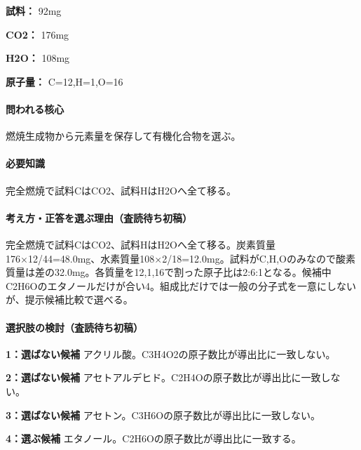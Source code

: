 \noindent\textbf{試料：} 92mg\par

\noindent\textbf{CO2：} 176mg\par

\noindent\textbf{H2O：} 108mg\par

\noindent\textbf{原子量：} C=\allowbreak{}12,H=\allowbreak{}1,O=\allowbreak{}16\par

\paragraph{問われる核心} 燃焼生成物から元素量を保存して有機化合物を選ぶ。

\paragraph{必要知識} 完全燃焼で試料CはCO2、試料HはH2Oへ全て移る。

\paragraph{考え方・正答を選ぶ理由（査読待ち初稿）} 完全燃焼で試料CはCO2、試料HはH2Oへ全て移る。炭素質量176×12/44=\allowbreak{}48.0mg、水素質量108×2/18=\allowbreak{}12.0mg。試料がC,H,Oのみなので酸素質量は差の32.0mg。各質量を12,1,16で割った原子比は2:6:1となる。候補中C2H6Oのエタノールだけが合い4。組成比だけでは一般の分子式を一意にしないが、提示候補比較で選べる。

\paragraph{選択肢の検討（査読待ち初稿）}\mbox{}\par

\noindent\textbf{1：選ばない候補} アクリル酸。C3H4O2の原子数比が導出比に一致しない。\par

\noindent\textbf{2：選ばない候補} アセトアルデヒド。C2H4Oの原子数比が導出比に一致しない。\par

\noindent\textbf{3：選ばない候補} アセトン。C3H6Oの原子数比が導出比に一致しない。\par

\noindent\textbf{4：選ぶ候補} エタノール。C2H6Oの原子数比が導出比に一致する。\par

